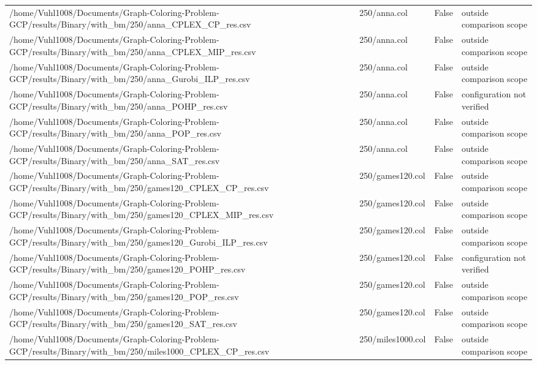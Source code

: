 \begin{table}[htbp]
\begin{tabular}{llll}
/home/Vuhl1008/Documents/Graph-Coloring-Problem-GCP/results/Binary/with\_bm/250/anna\_CPLEX\_CP\_res.csv & 250/anna.col & False & outside comparison scope \\
/home/Vuhl1008/Documents/Graph-Coloring-Problem-GCP/results/Binary/with\_bm/250/anna\_CPLEX\_MIP\_res.csv & 250/anna.col & False & outside comparison scope \\
/home/Vuhl1008/Documents/Graph-Coloring-Problem-GCP/results/Binary/with\_bm/250/anna\_Gurobi\_ILP\_res.csv & 250/anna.col & False & outside comparison scope \\
/home/Vuhl1008/Documents/Graph-Coloring-Problem-GCP/results/Binary/with\_bm/250/anna\_POHP\_res.csv & 250/anna.col & False & configuration not verified \\
/home/Vuhl1008/Documents/Graph-Coloring-Problem-GCP/results/Binary/with\_bm/250/anna\_POP\_res.csv & 250/anna.col & False & outside comparison scope \\
/home/Vuhl1008/Documents/Graph-Coloring-Problem-GCP/results/Binary/with\_bm/250/anna\_SAT\_res.csv & 250/anna.col & False & outside comparison scope \\
/home/Vuhl1008/Documents/Graph-Coloring-Problem-GCP/results/Binary/with\_bm/250/games120\_CPLEX\_CP\_res.csv & 250/games120.col & False & outside comparison scope \\
/home/Vuhl1008/Documents/Graph-Coloring-Problem-GCP/results/Binary/with\_bm/250/games120\_CPLEX\_MIP\_res.csv & 250/games120.col & False & outside comparison scope \\
/home/Vuhl1008/Documents/Graph-Coloring-Problem-GCP/results/Binary/with\_bm/250/games120\_Gurobi\_ILP\_res.csv & 250/games120.col & False & outside comparison scope \\
/home/Vuhl1008/Documents/Graph-Coloring-Problem-GCP/results/Binary/with\_bm/250/games120\_POHP\_res.csv & 250/games120.col & False & configuration not verified \\
/home/Vuhl1008/Documents/Graph-Coloring-Problem-GCP/results/Binary/with\_bm/250/games120\_POP\_res.csv & 250/games120.col & False & outside comparison scope \\
/home/Vuhl1008/Documents/Graph-Coloring-Problem-GCP/results/Binary/with\_bm/250/games120\_SAT\_res.csv & 250/games120.col & False & outside comparison scope \\
/home/Vuhl1008/Documents/Graph-Coloring-Problem-GCP/results/Binary/with\_bm/250/miles1000\_CPLEX\_CP\_res.csv & 250/miles1000.col & False & outside comparison scope \\

\end{tabular}
\end{table}
